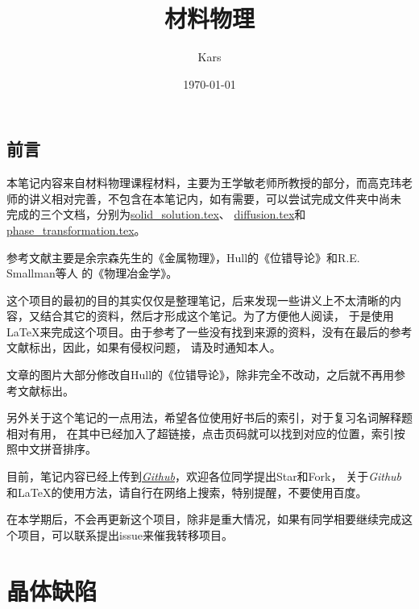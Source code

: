 \documentclass[12pt]{book}
\title{材料物理}
\author{Kars}
\date{\today}
\numberwithin{equation}{section}
\begin{document}
\maketitle




\clearpage
\frontmatter
\cleardoublepage
{}
{}
\chapter*{前言}
	本笔记内容来自材料物理课程材料，主要为王学敏老师所教授的部分，而高克玮老师的讲义相对完善，不包含在本笔记内，如有需要，可以尝试完成文件夹中尚未
	完成的三个文档，分别为\href{https://github.com/lkmpoijn/Material_Physics/blob/origin/Chapters/solid_solution.tex}{solid\_solution.tex}、
	\href{https://github.com/lkmpoijn/Material_Physics/blob/origin/Chapters/diffusion.tex}{diffusion.tex}和
	\href{https://github.com/lkmpoijn/Material_Physics/blob/origin/Chapters/phase_transformation.tex}{phase\_transformation.tex}。
	
	参考文献主要是余宗森先生的《金属物理》\cite{余宗森1982高等学校教学用书}，Hull的《位错导论》\cite{HULL201143}和R.E. Smallman等人
	的《物理冶金学》\cite{ngan2007physical}。

	这个项目的最初的目的其实仅仅是整理笔记，后来发现一些讲义上不太清晰的内容，又结合其它的资料，然后才形成这个笔记。为了方便他人阅读，
	于是使用\LaTeX 来完成这个项目。由于参考了一些没有找到来源的资料，没有在最后的参考文献标出，因此，如果有侵权问题，
	请及时通知本人。

	文章的图片大部分修改自Hull的《位错导论》\cite{HULL2011137}，除非完全不改动，之后就不再用参考文献标出。

	另外关于这个笔记的一点用法，希望各位使用好书后的索引，对于复习名词解释题相对有用，
	在其中已经加入了超链接，点击页码就可以找到对应的位置，索引按照中文拼音排序。
	
	目前，笔记内容已经上传到\href{https://github.com/lkmpoijn/Material_Physics}{\emph{Github}}，欢迎各位同学提出Star和Fork，
	关于\emph{Github}和\LaTeX 的使用方法，请自行在网络上搜索，特别提醒，不要使用百度。

	在本学期后，不会再更新这个项目，除非是重大情况，如果有同学相要继续完成这个项目，可以联系提出issue来催我转移项目。

\cleardoublepage
{}
{}
\tableofcontents


\mainmatter
\part{晶体缺陷}
	
	
	
\end{document}
